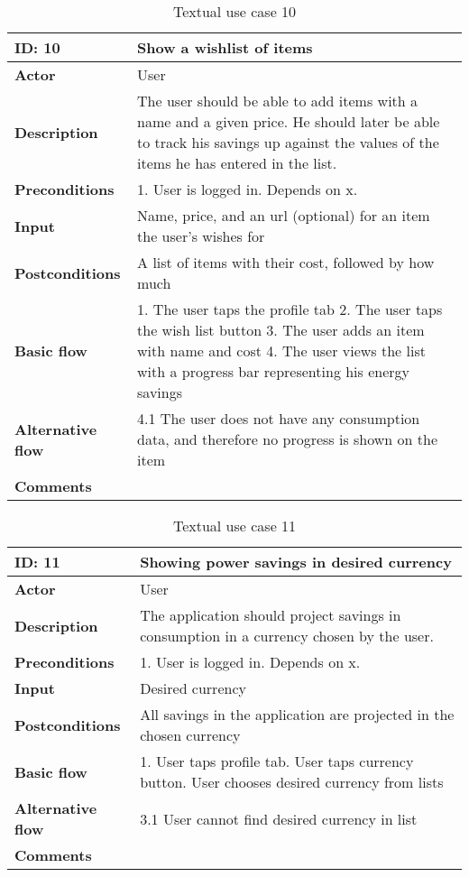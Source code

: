 \begin{table}[H]
\begin{tabular}{|l|p{11.7cm}|}
\hline
\textbf{ID: }10&\textbf{Show a wishlist of items }
\\\hline
\textbf{Actor} &User
\\\hline
\textbf{Description}&
The user should be able to add items with a name and a given price. He should later be able to track his savings up against the values of the items he has entered in the list.\\\hline
\textbf{Preconditions}&
1. User is logged in.\newline
Depends on x.\\\hline
\textbf{Input}&
Name, price, and an url (optional) for an item the user's wishes for
\\\hline
\textbf{Postconditions}& 
A list of items with their cost, followed by how much %
\\\hline
\textbf{Basic flow}&
1. The user taps the profile tab
2. The user taps the wish list button
3. The user adds an item with name and cost
4. The user views the list with a progress bar representing his energy savings\newline
\\\hline
\textbf{Alternative flow}&
4.1 The user does not have any consumption data, and therefore no progress is shown on the item
\\\hline
\textbf{Comments}& \\\hline
\end{tabular}
\caption{Textual use case 10}
\end{table}


\begin{table}[H]
\begin{tabular}{|l|p{11.7cm}|}
\hline
\textbf{ID: }11&\textbf{Showing power savings in desired currency}
\\\hline
\textbf{Actor} &User
\\\hline
\textbf{Description}&
The application should project savings in consumption in a currency chosen by the user.\\\hline
\textbf{Preconditions}&
1. User is logged in.\newline
Depends on x.\\\hline
\textbf{Input}&
Desired currency\\\hline
\textbf{Postconditions}& 
All savings in the application are projected in the chosen currency\\\hline
\textbf{Basic flow}&
1. User taps profile tab\newline
2. User taps currency button\newline
3. User chooses desired currency from lists
\\\hline
\textbf{Alternative flow}&
3.1 User cannot find desired currency in list
\\\hline
\textbf{Comments}& \\\hline
\end{tabular}
\caption{Textual use case 11}
\end{table}


